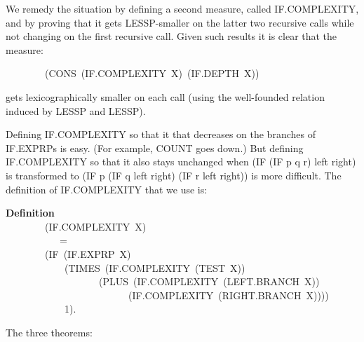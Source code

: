\documentclass[10pt]{book}
\newenvironment{pubasis}{\begin{flushleft}}{\end{flushleft}}
\newcommand{\axiomordefinition}[1]{\vspace{6pt}\Large\textsf{\textbf{#1}}\normalsize}
\begin{document}
We remedy the situation by defining a second measure, called IF.COMPLEXITY,
and by proving that it gets LESSP-smaller on the latter two recursive
calls while not changing on the first recursive call.  Given such results
it is clear that the measure:
\begin{pubasis}
~~~~~~~~(CONS~(IF.COMPLEXITY~X)~(IF.DEPTH~X))\\
\end{pubasis}
gets lexicographically smaller on each call (using the well-founded
relation induced by LESSP and LESSP).

Defining IF.COMPLEXITY so that it that decreases on the branches of IF.EXPRPs is easy.
(For example, COUNT goes down.)  But defining IF.COMPLEXITY so that it also stays
unchanged when (IF (IF p q r) left right) is transformed to
(IF p (IF q left right) (IF r left right)) is more difficult.  The
definition of IF.COMPLEXITY that we use is:
\begin{pubasis}
\axiomordefinition{Definition}\\
~~~~~~~~(IF.COMPLEXITY~X)\\
~~~~~~~~~~~=\\
~~~~~~~~(IF~(IF.EXPRP~X)\\
~~~~~~~~~~~~(TIMES~(IF.COMPLEXITY~(TEST~X))\\
~~~~~~~~~~~~~~~~~~~(PLUS~(IF.COMPLEXITY~(LEFT.BRANCH~X))\\
~~~~~~~~~~~~~~~~~~~~~~~~~(IF.COMPLEXITY~(RIGHT.BRANCH~X))))\\
~~~~~~~~~~~~1).\\
\end{pubasis}
The three theorems:
\end{document}
